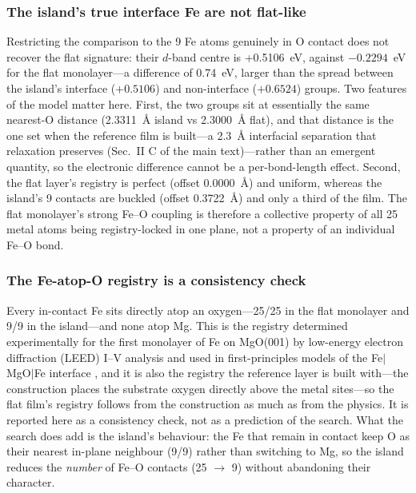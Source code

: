 \documentclass[10pt]{article}
\begin{document}
\subsubsection{The island's true interface Fe are not flat-like} Restricting the comparison
to the 9 Fe atoms genuinely in O contact does not recover the flat signature: their $d$-band centre
is +0.5106~eV, against $-0.2294$~eV for the flat monolayer---a difference of 0.74~eV, larger
than the spread between the island's interface ($+0.5106$) and non-interface ($+0.6524$) groups. Two
features of the model matter here. First, the two groups sit at essentially the same
nearest-O distance (2.3311~\AA{} island vs 2.3000~\AA{} flat), and that distance is the one set when
the reference film is built---a 2.3~\AA{} interfacial separation that relaxation preserves (Sec.~II C
of the main text)---rather than an emergent quantity, so the electronic difference cannot be
a per-bond-length effect. Second, the flat layer's registry is perfect (offset 0.0000~\AA) and
uniform, whereas the island's 9 contacts are buckled (offset 0.3722~\AA) and only a third of the
film. The flat monolayer's strong Fe--O coupling is therefore a collective property of all
25 metal atoms being registry-locked in one plane, not a property of an individual Fe--O bond.

\subsubsection{The Fe-atop-O registry is a consistency check} Every in-contact Fe sits
directly atop an oxygen---25/25 in the flat monolayer and 9/9 in the island---and none atop
Mg. This is the registry determined experimentally for the first monolayer of Fe on MgO(001) by
low-energy electron diffraction (LEED) I--V analysis \cite{urano1988} and used in first-principles models of the Fe$|$MgO$|$Fe interface
\cite{butler2001}, and it is also the registry the reference layer is built with---the construction
places the substrate oxygen directly above the metal sites---so the flat film's registry follows from
the construction as much as from the physics. It is reported here as a consistency check, not
as a prediction of the search. What the search does add is the island's behaviour: the Fe that
remain in contact keep O as their nearest in-plane neighbour (9/9) rather than switching to Mg, so
the island reduces the \emph{number} of Fe--O contacts (25 $\to$ 9) without abandoning their
character.
\end{document}
